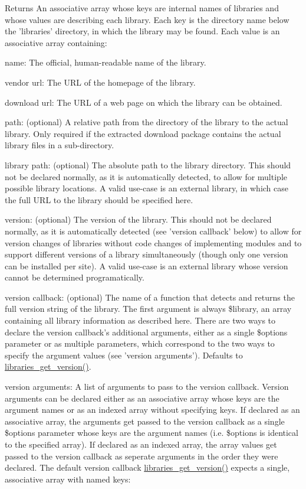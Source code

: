 \begin{DoxyReturn}{Returns}
An associative array whose keys are internal names of libraries and whose values are describing each library. Each key is the directory name below the 'libraries' directory, in which the library may be found. Each value is an associative array containing:
\begin{DoxyItemize}
\item name: The official, human-\/readable name of the library.
\item vendor url: The URL of the homepage of the library.
\item download url: The URL of a web page on which the library can be obtained.
\item path: (optional) A relative path from the directory of the library to the actual library. Only required if the extracted download package contains the actual library files in a sub-\/directory.
\item library path: (optional) The absolute path to the library directory. This should not be declared normally, as it is automatically detected, to allow for multiple possible library locations. A valid use-\/case is an external library, in which case the full URL to the library should be specified here.
\item version: (optional) The version of the library. This should not be declared normally, as it is automatically detected (see 'version callback' below) to allow for version changes of libraries without code changes of implementing modules and to support different versions of a library simultaneously (though only one version can be installed per site). A valid use-\/case is an external library whose version cannot be determined programatically.
\item version callback: (optional) The name of a function that detects and returns the full version string of the library. The first argument is always \$library, an array containing all library information as described here. There are two ways to declare the version callback's additional arguments, either as a single \$options parameter or as multiple parameters, which correspond to the two ways to specify the argument values (see 'version arguments'). Defaults to \hyperlink{libraries_8module_a75db4e86addc3ceb4df8d0e1f5a54f99}{libraries\_\-get\_\-version()}.
\item version arguments: A list of arguments to pass to the version callback. Version arguments can be declared either as an associative array whose keys are the argument names or as an indexed array without specifying keys. If declared as an associative array, the arguments get passed to the version callback as a single \$options parameter whose keys are the argument names (i.e. \$options is identical to the specified array). If declared as an indexed array, the array values get passed to the version callback as seperate arguments in the order they were declared. The default version callback \hyperlink{libraries_8module_a75db4e86addc3ceb4df8d0e1f5a54f99}{libraries\_\-get\_\-version()} expects a single, associative array with named keys:

\end{DoxyItemize}
\end{DoxyReturn}
